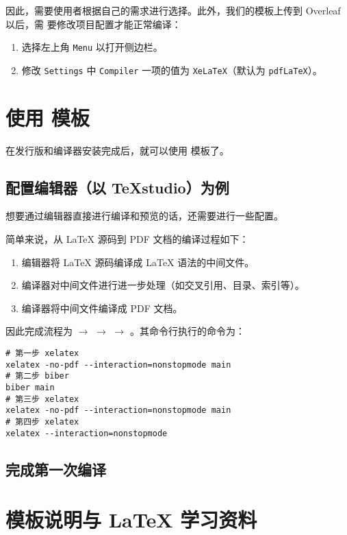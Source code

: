 因此，需要使用者根据自己的需求进行选择。此外，我们的模板上传到 Overleaf 以后，需
要修改项目配置才能正常编译：
\begin{enumerate}[noitemsep]
  \item 选择左上角 \texttt{Menu} 以打开侧边栏。
  \item 修改 \texttt{Settings} 中 \texttt{Compiler} 一项的值为 \texttt{XeLaTeX}（默认为 \texttt{pdfLaTeX}）。
\end{enumerate}

\section{使用 \BIThesis{} 模板}
\label{sec:using-bithesis}

在发行版和编译器安装完成后，就可以使用 \BIThesis{}模板了。

\subsection{配置编辑器（以 TeXstudio）为例}

想要通过编辑器直接进行编译和预览的话，还需要进行一些配置。

简单来说，从 \LaTeX{} 源码到 PDF 文档的编译过程如下：
\begin{enumerate}
  \item 编辑器将 \LaTeX{} 源码编译成 \LaTeX{} 语法的中间文件。
  \item 编译器对中间文件进行进一步处理（如交叉引用、目录、索引等）。
  \item 编译器将中间文件编译成 PDF 文档。
\end{enumerate}

因此完成流程为   $\rightarrow$  $\rightarrow$  $\rightarrow$  。其命令行执行的命令为：

\begin{verbatim}
# 第一步 xelatex
xelatex -no-pdf --interaction=nonstopmode main
# 第二步 biber
biber main
# 第三步 xelatex
xelatex -no-pdf --interaction=nonstopmode main
# 第四步 xelatex
xelatex --interaction=nonstopmode

\end{verbatim}

\subsection{完成第一次编译}

\section{模板说明与 LaTeX 学习资料}
